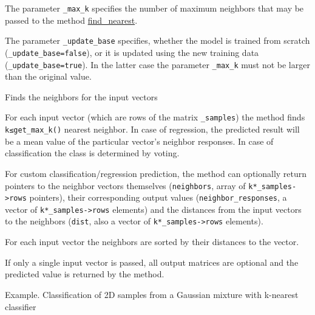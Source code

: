 The parameter \texttt{\_max\_k} specifies the number of maximum neighbors that may be passed to the method \href{#CvKNearest.3A.3Afindnearest}{find\_nearest}.

The parameter \texttt{\_update\_base} specifies, whether the model is trained from scratch (\texttt{\_update\_base=false}), or it is updated using the new training data (\texttt{\_update\_base=true}). In the latter case the parameter \texttt{\_max\_k} must not be larger than the original value.



Finds the neighbors for the input vectors


For each input vector (which are rows of the matrix \texttt{\_samples}) the method finds \texttt{k≤get\_max\_k()} nearest neighbor. In case of regression, the predicted result will be a mean value of the particular vector's neighbor responses. In case of classification the class is determined by voting.

For custom classification/regression prediction, the method can optionally return pointers to the neighbor vectors themselves (\texttt{neighbors}, array of \texttt{k*\_samples->rows} pointers), their corresponding output values (\texttt{neighbor\_responses}, a vector of \texttt{k*\_samples->rows} elements) and the distances from the input vectors to the neighbors (\texttt{dist}, also a vector of \texttt{k*\_samples->rows} elements).

For each input vector the neighbors are sorted by their distances to the vector.

If only a single input vector is passed, all output matrices are optional and the predicted value is returned by the method.

Example. Classification of 2D samples from a Gaussian mixture with k-nearest classifier

